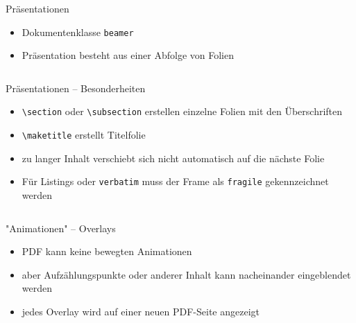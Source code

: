 \documentclass[presentation,aspectratio=169]{beamer}
\begin{document}
\begin{frame}[fragile]{Präsentationen}
  \begin{itemize}
    \item Dokumentenklasse \verb|beamer|
    \item Präsentation besteht aus einer Abfolge von Folien
      \inputminted{latex}{codebeispiele/beamer-frame.tex}
  \end{itemize}
\end{frame}

\begin{frame}[fragile]{Präsentationen -- Besonderheiten}
  \begin{itemize}
    \item \verb|\section| oder \verb|\subsection| erstellen einzelne Folien mit den Überschriften
    \item \verb|\maketitle| erstellt Titelfolie
    \item zu langer Inhalt verschiebt sich nicht automatisch auf die nächste Folie
    \item Für Listings oder \verb|verbatim| muss der Frame als \verb|fragile| gekennzeichnet werden
      \inputminted{latex}{codebeispiele/frame-fragile.tex}
  \end{itemize}
\end{frame}

\begin{frame}[fragile]{"Animationen" -- Overlays}
  \begin{itemize}
    \item PDF kann keine bewegten Animationen
    \item aber Aufzählungspunkte oder anderer Inhalt kann nacheinander eingeblendet werden
    \item jedes Overlay wird auf einer neuen PDF-Seite angezeigt
      \inputminted{latex}{codebeispiele/beamer-overlays.tex}
  \end{itemize}
\end{frame}
\end{document}
